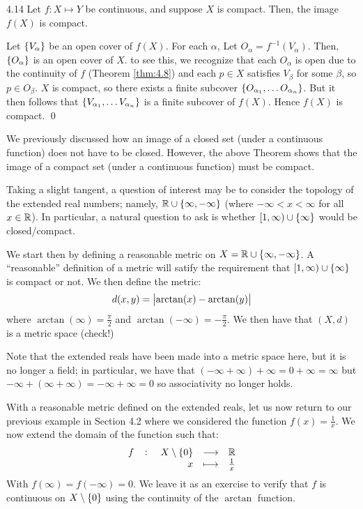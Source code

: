 \setcounter{rudin}{13}
\begin{theorem}{}{4.14}
    Let $f: X \mapsto Y$ be continuous, and suppose $X$ is compact. Then, the image $f(X)$ is compact.
\end{theorem}
\begin{nproof}
    Let $\set{V_\alpha}$ be an open cover of $f(X)$. For each $\alpha$, Let $O_\alpha = f^{-1}(V_\alpha)$. Then, $\set{O_\alpha}$ is an open cover of $X$. to see this, we recognize that each $O_\alpha$ is open due to the continuity of $f$ (Theorem \ref{thm:4.8}) and each $p \in X$ satisfies $V_\beta$ for some $\beta$, so $p \in O_\beta$. $X$ is compact, so there exists a finite subcover $\set{O_{\alpha_1}, \ldots O_{\alpha_n}}$. But it then follows that $\set{V_{\alpha_1}, \ldots V_{\alpha_n}}$ is a finite subcover of $f(X)$. Hence $f(X)$ is compact. \qed
\end{nproof}
\noindent We previously discussed how an image of a closed set (under a continuous function) does not have to be closed. However, the above Theorem shows that the image of a compact set (under a continuous function) must be compact.

Taking a slight tangent, a question of interest may be to consider the topology of the extended real numbers; namely, $\mathbb{R} \cup \set{\infty, -\infty}$ (where $-\infty < x < \infty$ for all $x \in \mathbb{R}$). In particular, a natural question to ask is whether $[1, \infty) \cup \set{\infty}$ would be closed/compact.

We start then by defining a reasonable metric on $X = \mathbb{R} \cup \set{\infty, -\infty}$. A ``reasonable'' definition of a metric will satify the requirement that $[1, \infty) \cup \set{\infty}$ is compact or not. We then define the metric:
\begin{align*}
    d(x, y) = \abs{\arctan(x) - \arctan(y)}
\end{align*}
where $\arctan(\infty) = \frac{\pi}{2}$ and $\arctan(-\infty) = -\frac{\pi}{2}$. We then have that $(X, d)$ is a metric space (check!) 

Note that the extended reals have been made into a metric space here, but it is no longer a field; in particular, we have that $(-\infty + \infty) + \infty = 0 + \infty = \infty$ but $-\infty + (\infty + \infty) = -\infty + \infty = 0$ so associativity no longer holds.

With a reasonable metric defined on the extended reals, let us now return to our previous example in Section 4.2 where we considered the function $f(x) = \frac{1}{x}$. We now extend the domain of the function such that:
\begin{align*}
    \fullfunction{f}{X \setminus \set{0}}{\RR}{x}{\frac{1}{x}}
\end{align*}
With $f(\infty) = f(-\infty) = 0$. We leave it as an exercise to verify that $f$ is continuous on $X \setminus \set{0}$ using the continuity of the $\arctan$ function. 

